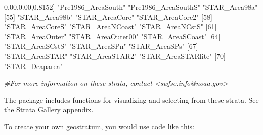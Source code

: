 \documentclass[
]{book}
\newenvironment{Shaded}{\begin{snugshade}}{\end{snugshade}}
\newcommand{\CommentTok}[1]{\textcolor[rgb]{0.56,0.35,0.01}{\textit{#1}}}
\newcommand{\DecValTok}[1]{\textcolor[rgb]{0.00,0.00,0.81}{#1}}
\newcommand{\NormalTok}[1]{#1}
\newcommand{\StringTok}[1]{\textcolor[rgb]{0.31,0.60,0.02}{#1}}
\begin{document}
\begin{Shaded}
\begin{Highlighting}[]
\NormalTok{[}\DecValTok{52}\NormalTok{] }\StringTok{"Pre1986\_AreaSouth"}  \StringTok{"Pre1986\_AreaSouthS"} \StringTok{"STAR\_Area98a"}      
\NormalTok{[}\DecValTok{55}\NormalTok{] }\StringTok{"STAR\_Area98b"}       \StringTok{"STAR\_AreaCore"}      \StringTok{"STAR\_AreaCore2"}    
\NormalTok{[}\DecValTok{58}\NormalTok{] }\StringTok{"STAR\_AreaCoreS"}     \StringTok{"STAR\_AreaNCoast"}    \StringTok{"STAR\_AreaNCstS"}    
\NormalTok{[}\DecValTok{61}\NormalTok{] }\StringTok{"STAR\_AreaOuter"}     \StringTok{"STAR\_AreaOuter00"}   \StringTok{"STAR\_AreaSCoast"}   
\NormalTok{[}\DecValTok{64}\NormalTok{] }\StringTok{"STAR\_AreaSCstS"}     \StringTok{"STAR\_AreaSPn"}       \StringTok{"STAR\_AreaSPs"}      
\NormalTok{[}\DecValTok{67}\NormalTok{] }\StringTok{"STAR\_AreaSTAR"}      \StringTok{"STAR\_AreaSTAR2"}     \StringTok{"STAR\_AreaSTARlite"} 
\NormalTok{[}\DecValTok{70}\NormalTok{] }\StringTok{"STAR\_Dcaparea"}     

\CommentTok{\#For more information on these strata, contact \textless{}swfsc.info@noaa.gov\textgreater{} }
\end{Highlighting}
\end{Shaded}

The package includes functions for visualizing and selecting from these strata. See the \protect\hyperlink{stratagallery}{Strata Gallery} appendix.

To create your own geostratum, you would use code like this:
\end{document}
